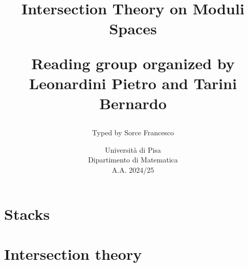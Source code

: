 \documentclass[a4paper]{report}
\title{{\Huge\bf Intersection Theory on Moduli Spaces}
\vspace{0.7cm}

\Large Reading group organized by\\ Leonardini Pietro and Tarini Bernardo\vfill}
\author{\Large Typed by Sorce Francesco}
\date{\vspace{1cm} Università di Pisa\\
Dipartimento di Matematica\\
A.A. 2024/25}
\begin{document}
\maketitle





\tableofcontents
\newpage

\part{Stacks}




\part{Intersection theory}




\appendix


\end{document}
